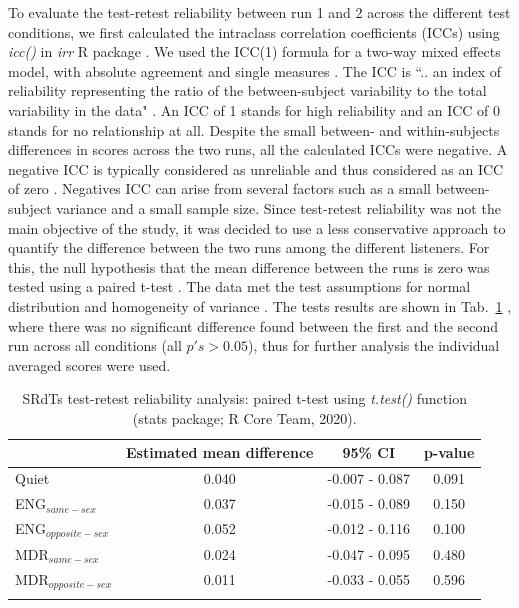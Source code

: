 \documentclass[a4paper, twoside]{templates/ociamthesis}
\begin{document}
To evaluate the test-retest reliability between run 1 and 2 across the different test conditions, we first calculated the intraclass correlation coefficients (ICCs) using \textit{icc()} in \textit{irr} R package \autocite{Stats_TestRetest_irr}. We used the ICC(1) formula for a two-way mixed effects model, with absolute agreement and single measures \autocite[cf.][]{Koo2016}. The ICC is ``.. an index of reliability representing the ratio of the between-subject variability to the total variability in the data" \autocite[p.~458]{Leensen2013}. An ICC of 1 stands for high reliability and an ICC of 0 stands for no relationship at all. Despite the small between- and within-subjects differences in scores across the two runs, all the calculated ICCs were negative. A negative ICC is typically considered as unreliable and thus considered as an ICC of zero \autocites[e.g.,][]{Qin2019,Matheson2019}. Negatives ICC can arise from several factors such as a small between-subject variance and a small sample size. Since test-retest reliability was not the main objective of the study, it was decided to use a less conservative approach to quantify the difference between the two runs among the different listeners. For this, the null hypothesis that the mean difference between the runs is zero was tested using a paired t-test \autocite[\textit{t.test()}, stats package;][]{RCoreTeam}. The data met the test assumptions for normal distribution \autocite[Shapiro-Wilk test;][]{Stats_ShapiroWilkRPackage} and homogeneity of variance \autocite[Levene's test;][]{Car_LevenTestRPackage}. The tests results are shown in Tab.~\ref{tab:Exp2_TestRetest} , where there was no significant difference found between the first and the second run across all conditions (all \(p's > 0.05\)), thus for further analysis the individual averaged scores were used.\\

\begin{table}[ht]
\caption{\label{tab:Exp2_TestRetest}{SRdTs test-retest reliability analysis: paired t-test using \textit{t.test()} function (stats package; R Core Team, 2020).}}
\renewcommand{\arraystretch}{2}
\begin{tabular}{l c c c}
\hline\hline
 &Estimated mean difference &95\% CI&p-value\\ 
\hline
Quiet & 0.040 & -0.007 -  0.087 & 0.091\\
ENG$_{same-sex}$ &  0.037 & -0.015 - 0.089 & 0.150\\
ENG$_{opposite-sex}$ & 0.052 & -0.012 - 0.116 & 0.100 \\
MDR$_{same-sex}$ & 0.024 & -0.047 - 0.095 & 0.480 \\
MDR$_{opposite-sex}$ & 0.011 & -0.033 - 0.055 & 0.596 \\
\hline\hline
\\
\end{tabular}
\label{tab:Exp2_TestRetest}
\end{table} 
\end{document}

